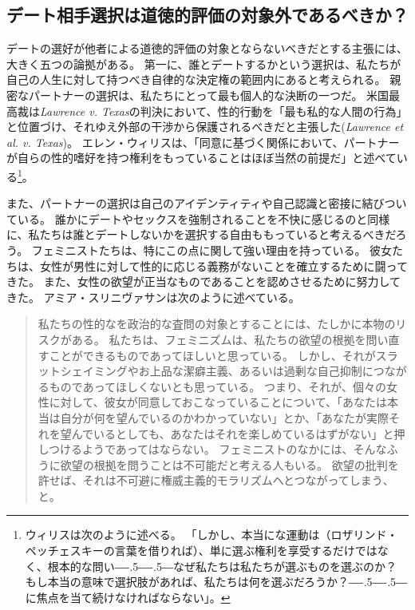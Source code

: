 \documentclass[paper=a4,book,openany]{jlreq}
\def\DDASH{―\kern-.5\zw―\kern-.5\zw―}
\begin{document}
\subsection{デート相手選択は道徳的評価の対象外であるべきか？}

デートの選好が他者による道徳的評価の対象とならないべきだとする主張には、大きく五つの論拠がある。
第一に、誰とデートするかという選択は、私たちが自己の人生に対して持つべき自律的な決定権の範囲内にあると考えられる。
親密なパートナーの選択は、私たちにとって最も個人的な決断の一つだ。
米国最高裁は\emph{Lawrence v. Texas}の判決において、性的行動を「最も私的な人間の行為」と位置づけ、それゆえ外部の干渉から保護されるべきだと主張した(\emph{Lawrence et al. v. Texas})。
エレン・ウィリスは、「同意に基づく関係において、パートナーが自らの性的嗜好を持つ権利をもっていることはほぼ当然の前提だ」と述べている\footnote{ウィリスは次のように述べる。
「しかし、本当にな運動は（ロザリンド・ペッチェスキーの言葉を借りれば）、単に選ぶ権利を享受するだけではなく、根本的な問い{\DDASH}なぜ私たちは私たちが選ぶものを選ぶのか？ もし本当の意味で選択肢があれば、私たちは何を選ぶだろうか？{\DDASH}に焦点を当て続けなければならない」。
}\citep[p.14]{willis92:_no_more_nice_girls}。

また、パートナーの選択は自己のアイデンティティや自己認識と密接に結びついている。
誰かにデートやセックスを強制されることを不快に感じるのと同様に、私たちは誰とデートしないかを選択する自由ももっていると考えるべきだろう。
フェミニストたちは、特にこの点に関して強い理由を持っている。
彼女たちは、女性が男性に対して性的に応じる義務がないことを確立するために闘ってきた。
また、女性の欲望が正当なものであることを認めさせるために努力してきた。
アミア・スリニヴァサンは次のように述べている。

\begin{quote}
私たちの性的なを政治的な査問の対象とすることには、たしかに本物のリスクがある。
私たちは、フェミニズムは、私たちの欲望の根拠を問い直すことができるものであってほしいと思っている。
しかし、それがスラットシェイミングやお上品な潔癖主義、あるいは過剰な自己抑制につながるものであってほしくないとも思っている。
つまり、それが、個々の女性に対して、彼女が同意しておこなっていることについて、「あなたは本当は自分が何を望んでいるのかわかっていない」とか、「あなたが実際それを望んでいるとしても、あなたはそれを楽しめているはずがない」と押しつけるようであってはならない。
フェミニストのなかには、そんなふうに欲望の根拠を問うことは不可能だと考える人もいる。
欲望の批判を許せば、それは不可避に権威主義的モラリズムへとつながってしまう、と。
\citep{srinivasan18:_does_anyon_have_right_sex}
\end{quote}
\end{document}
